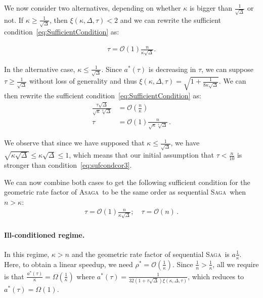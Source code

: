 \documentclass[twoside]{article}
\newcommand{\overlap}{\tau}
\newcommand{\contraction}{\rho}
\newcommand{\sparsity}{\Delta}
\newcommand{\ASAGA}{\textsc{Asaga}}
\newcommand{\SAGA}{\textsc{Saga}}
\begin{document}
We now consider two alternatives, depending on whether $\kappa$ is bigger than $\frac{1}{\sqrt{\sparsity}}$ or not. If $\kappa \geq \frac{1}{\sqrt{\sparsity}}$, then $\xi(\kappa, \sparsity, \overlap) < 2$ and we can rewrite the sufficient condition~\eqref{eq:SufficientCondition} as:

\begin{align}
\overlap = \mathcal{O}(1) \frac{n}{\kappa\sqrt{\sparsity}}.
\end{align}

In the alternative case, $\kappa \leq \frac{1}{\sqrt{\sparsity}}$. 
Since $a^*(\overlap)$ is decreasing in $\overlap$, we can suppose $\overlap \geq \frac{1}{\sqrt{\sparsity}}$ without loss of generality and thus $\xi(\kappa, \sparsity, \overlap) = \sqrt{1 + \frac{1}{8 \kappa \sqrt{\sparsity}}}$.
We can then rewrite the sufficient condition~\eqref{eq:SufficientCondition} as:
\begin{align}\label{eq:sufcondcor3}
\frac{\overlap \sqrt{\sparsity}}{\sqrt{\kappa}\sqrt[4]{\sparsity}} &= \mathcal{O}(\frac{n}{\kappa})
\nonumber \\
\overlap &= \mathcal{O}(1)\frac{n}{\sqrt{\kappa}\sqrt[4]{\sparsity}} \, .
\end{align}

We observe that since we have supposed that $\kappa \leq \frac{1}{\sqrt{\sparsity}}$, we have $\sqrt{\kappa \sqrt{\sparsity}} \leq \kappa \sqrt{\sparsity} \leq 1$, which means that our initial assumption that $\overlap < \frac{n}{10}$ is stronger than condition~\eqref{eq:sufcondcor3}.

We can now combine both cases to get the following sufficient condition for the geometric rate factor of \ASAGA\ to be the same order as sequential \SAGA\ when $n > \kappa$:
\begin{align}
\overlap = \mathcal{O}(1) \frac{n}{\kappa\sqrt{\sparsity}}; \quad
\overlap = \mathcal{O}(n) \, . 
\end{align}

\paragraph{Ill-conditioned regime.}
In this regime, $\kappa > n$ and the geometric rate factor of sequential \SAGA\ is $a \frac{1}{\kappa}$. 
Here, to obtain a linear speedup, we need $\contraction^* = \mathcal{O}(\frac{1}{\kappa})$.
Since $\frac{1}{n} > \frac{1}{\kappa}$, all we require is that $\frac{a^*(\overlap)}{\kappa} = \Omega(\frac{1}{\kappa})$ where $a^*(\overlap) = \frac{1}{32 \left(1+ \overlap  \sqrt \sparsity \right) \xi(\kappa, \sparsity, \overlap)}$, which reduces to $a^*(\overlap) = \Omega(1)$.
\end{document}
